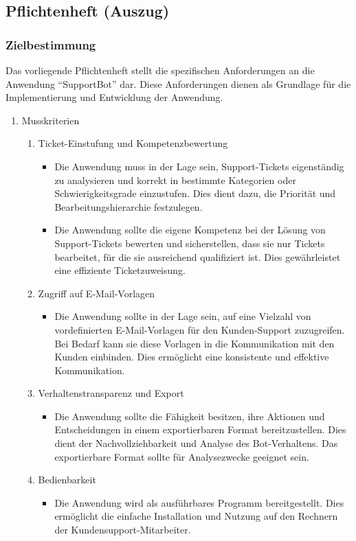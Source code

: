 \subsection{Pflichtenheft (Auszug)}
\label{app:Pflichtenheft}

\subsubsection*{Zielbestimmung}
Das vorliegende Pflichtenheft stellt die spezifischen Anforderungen an die Anwendung ``SupportBot'' dar. Diese Anforderungen dienen als Grundlage für die Implementierung und Entwicklung der Anwendung.
		

\begin{enumerate}[itemsep=0em,partopsep=0em,parsep=0em,topsep=0em]
\item Musskriterien
	\begin{enumerate}
		\item Ticket-Einstufung und Kompetenzbewertung
		\begin{itemize}
			\item Die Anwendung muss in der Lage sein, Support-Tickets eigenständig zu analysieren und korrekt in bestimmte Kategorien oder Schwierigkeitsgrade einzustufen. Dies dient dazu, die Priorität und Bearbeitungshierarchie festzulegen.
			\item Die Anwendung sollte die eigene Kompetenz bei der Lösung von Support-Tickets bewerten und sicherstellen, dass sie nur Tickets bearbeitet, für die sie ausreichend qualifiziert ist. Dies gewährleistet eine effiziente Ticketzuweisung.
		\end{itemize}
		\item Zugriff auf E-Mail-Vorlagen
			\begin{itemize}
			\item Die Anwendung sollte in der Lage sein, auf eine Vielzahl von vordefinierten E-Mail-Vorlagen für den Kunden-Support zuzugreifen. Bei Bedarf kann sie diese Vorlagen in die Kommunikation mit den Kunden einbinden. Dies ermöglicht eine konsistente und effektive Kommunikation.
			\end{itemize}
		\item Verhaltenstransparenz und Export
			\begin{itemize}
			\item Die Anwendung sollte die Fähigkeit besitzen, ihre Aktionen und Entscheidungen in einem exportierbaren Format bereitzustellen. Dies dient der Nachvollziehbarkeit und Analyse des Bot-Verhaltens. Das exportierbare Format sollte für Analysezwecke geeignet sein.
			\end{itemize}
		\item Bedienbarkeit
			\begin{itemize}
			\item Die Anwendung wird als ausführbares Programm bereitgestellt. Dies ermöglicht die einfache Installation und Nutzung auf den Rechnern der Kundensupport-Mitarbeiter.
			\end{itemize}
	\end{enumerate}
\end{enumerate}


